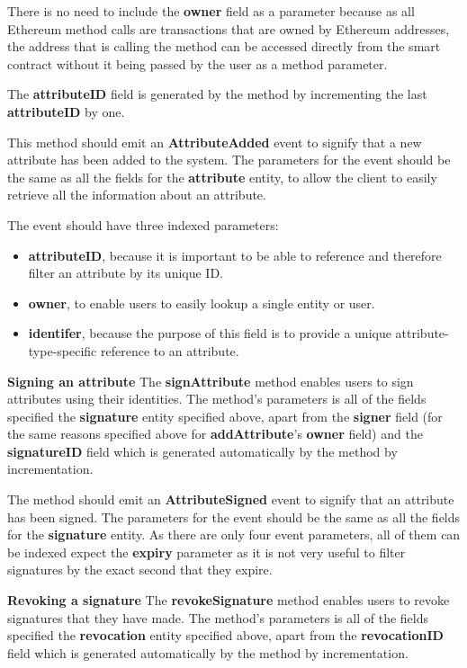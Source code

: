 \documentclass[12pt,a4paper]{report}
\begin{document}
	There is no need to include the \textbf{owner} field as a parameter because as all Ethereum method calls are transactions that are owned by Ethereum addresses, the address that is calling the method can be accessed directly from the smart contract without it being passed by the user as a method parameter.
	
	The \textbf{attributeID} field is generated by the method by incrementing the last \textbf{attributeID} by one.
	
	This method should emit an \textbf{AttributeAdded} event to signify that a new attribute has been added to the system. The parameters for the event should be the same as all the fields for the \textbf{attribute} entity, to allow the client to easily retrieve all the information about an attribute.
	
	The event should have three indexed parameters:
	\begin{itemize}
		\item \textbf{attributeID}, because it is important to be able to reference and therefore filter an attribute by its unique ID.
		\item \textbf{owner}, to enable users to easily lookup a single entity or user.
		\item \textbf{identifer}, because the purpose of this field is to provide a unique attribute-type-specific reference to an attribute.
	\end{itemize}
	
	\bigskip
	\noindent \textbf{Signing an attribute}\newline
	The \textbf{signAttribute} method enables users to sign attributes using their identities. The method's parameters is all of the fields specified the \textbf{signature} entity specified above, apart from the \textbf{signer} field (for the same reasons specified above for \textbf{addAttribute}'s \textbf{owner} field) and the \textbf{signatureID} field which is generated automatically by the method by incrementation.
	
	The method should emit an \textbf{AttributeSigned} event to signify that an attribute has been signed. The parameters for the event should be the same as all the fields for the \textbf{signature} entity. As there are only four event parameters, all of them can be indexed expect the \textbf{expiry} parameter as it is not very useful to filter signatures by the exact second that they expire.
	
	\bigskip
	\noindent \textbf{Revoking a signature}\newline
	The \textbf{revokeSignature} method enables users to revoke signatures that they have made. The method's parameters is all of the fields specified the \textbf{revocation} entity specified above, apart from the \textbf{revocationID} field which is generated automatically by the method by incrementation.
	
\end{document}
